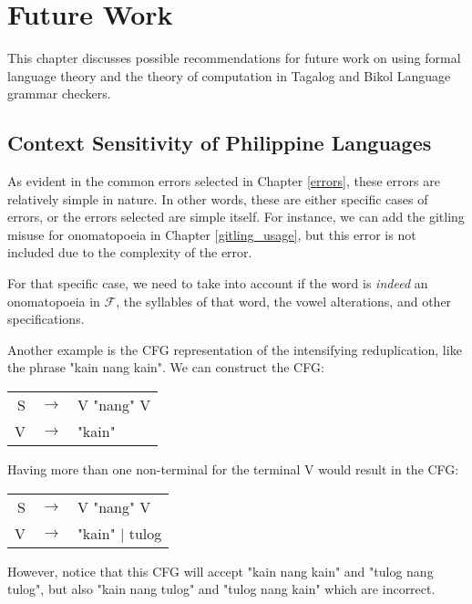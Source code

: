 \chapter{Future Work}
\label{future_work}

This chapter discusses possible recommendations for future work on using formal language theory and the theory of computation in Tagalog and Bikol Language grammar checkers.

\section{Context Sensitivity of Philippine Languages}

As evident in the common errors selected in Chapter \ref{errors}, these errors are relatively simple in nature. In other words, these are either specific cases of errors, or the errors selected are simple itself. For instance, we can add the gitling misuse for onomatopoeia in Chapter \ref{gitling_usage}, but this error is not included due to the complexity of the error.

 For that specific case, we need to take into account if the word is \textit{indeed} an onomatopoeia in $\mathcal{F}$, the syllables of that word, the vowel alterations, and other specifications.

 Another example is the CFG representation of the intensifying reduplication, like the phrase "kain nang kain". We can construct the CFG:

 \begin{center}
     \begin{tabular}{rcl}
         S & $\to$ &  V "nang" V \\ 
         V & $\to$ & "kain"
     \end{tabular}
 \end{center}

Having more than one non-terminal for the terminal V would result in the CFG:


 \begin{center}
     \begin{tabular}{rcl}
          S & $\to$ & V "nang" V \\
          V & $\to$ & "kain" | tulog
     \end{tabular}
 \end{center}

However, notice that this CFG will accept "kain nang kain" and "tulog nang tulog", but also "kain nang tulog" and "tulog nang kain" which are incorrect.

